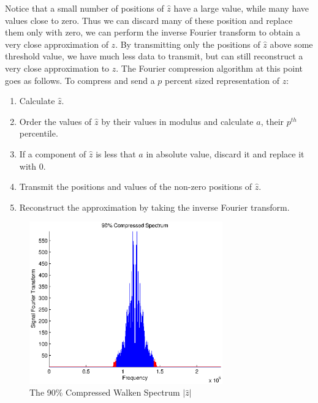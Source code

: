 \documentclass{report}
\begin{document}
Notice that a small number of positions of $\hat z$ have a large value, while many have values close to zero. Thus we can discard many of these position and replace them only with zero, we can perform the inverse Fourier transform to obtain a very close approximation of $z$. By transmitting only the positions of $\hat z$ above some threshold value, we have much less data to transmit, but can still reconstruct a very close approximation to $z$. The Fourier compression algorithm at this point goes as follows. To compress and send a $p$ percent sized representation of $z$:
\begin{enumerate}
\item Calculate $\hat z$.
\item Order the values of $\hat z$ by their values in modulus and calculate $a$, their $p^{th}$ percentile.
\item If a component of $\hat z$ is less that $a$ in absolute value, discard it and replace it with $0$.
\item Transmit the positions and values of the non-zero positions of $\hat z$.
\item Reconstruct the approximation by taking the inverse Fourier transform.
\end{enumerate}

\begin{figure}
\center
\caption{The 90\% Compressed Walken Spectrum $|\hat z|$}
\label{fig:90Fwak}
\includegraphics[height=7cm]{90four.eps}


\end{figure}
\end{document}
